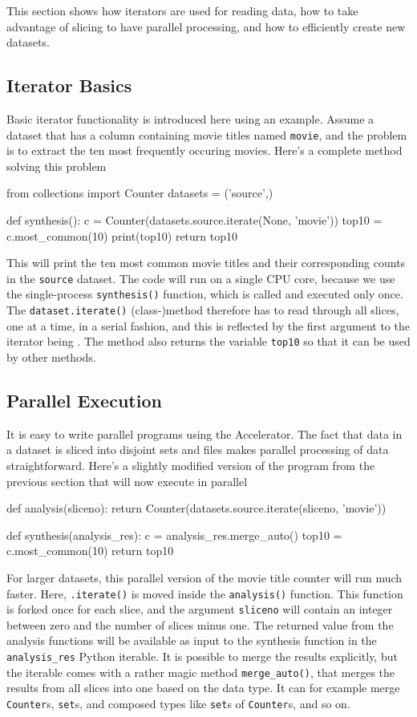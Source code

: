This section shows how iterators are used for reading data, how to
take advantage of slicing to have parallel processing, and how to
efficiently create new datasets.


\subsection{Iterator Basics}

Basic iterator functionality is introduced here using an example.
Assume a dataset that has a column containing movie titles named
\texttt{movie}, and the problem is to extract the ten most frequently
occuring movies.  Here's a complete method solving this problem
\begin{python}
from collections import Counter
datasets = ('source',)

def synthesis():
    c = Counter(datasets.source.iterate(None, 'movie'))
    top10 = c.most_common(10)
    print(top10)
    return top10
\end{python}
This will print the ten most common movie titles and their
corresponding counts in the \texttt{source} dataset.  The code will
run on a single CPU core, because we use the single-process
\texttt{synthesis()} function, which is called and executed only once.
The \texttt{dataset.iterate()} (class-)method therefore has to read
through all slices, one at a time, in a serial fashion, and this is
reflected by the first argument to the iterator being \pyNone.  The
method also returns the variable \texttt{top10} so that it can be used
by other methods.



\subsection{Parallel Execution}
It is easy to write parallel programs using the Accelerator.  The fact
that data in a dataset is sliced into disjoint sets and files makes
parallel processing of data straightforward.  Here's a slightly
modified version of the program from the previous section that will
now execute in parallel
\begin{python}
def analysis(sliceno):
    return Counter(datasets.source.iterate(sliceno, 'movie'))

def synthesis(analysis_res):
    c = analysis_res.merge_auto()
    top10 = c.most_common(10)
    return top10
\end{python}
For larger datasets, this parallel version of the movie title counter
will run much faster.  Here, \texttt{.iterate()} is moved inside the
\texttt{analysis()} function.  This function is forked once for each
slice, and the argument \texttt{sliceno} will contain an integer
between zero and the number of slices minus one.  The returned value
from the analysis functions will be available as input to the
synthesis function in the \texttt{analysis\_res} Python iterable.  It
is possible to merge the results explicitly, but the iterable
comes with a rather magic method \texttt{merge\_auto()}, that merges
the results from all slices into one based on the data type.  It can
for example merge \texttt{Counter}s, \texttt{set}s, and composed types
like \texttt{set}s of \texttt{Counter}s, and so on.


